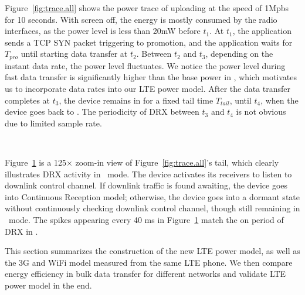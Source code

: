 Figure~\ref{fig:trace.all} shows the power trace of uploading at the speed of 1Mpbs for 10 seconds. With screen off, the energy is mostly consumed by the radio interfaces, as the power level is less than 20mW before $t_1$. At $t_1$, the application sends a TCP {\sf SYN} packet triggering \RI to \RC promotion, and the application waits for $T_{pro}$ until starting data transfer at $t_2$. Between $t_2$ and $t_3$, depending on the instant data rate, the power level fluctuates. We notice the power level during fast data transfer is significantly higher than the base power in \RC, which motivates us to incorporate data rates into our LTE power model. After the data transfer completes at $t_3$, the device remains in \RC for a fixed tail time $T_{tail}$, until $t_4$, when the device goes back to \RI. The periodicity of DRX between $t_3$ and $t_4$ is not obvious due to limited sample rate.


\begin{figure}[h]
\centering
{} \\
\label{fig:trace.zoom}
\end{figure}

Figure~\ref{fig:trace.zoom} is a 125$\times$ zoom-in view of Figure~\ref{fig:trace.all}'s tail, which clearly illustrates DRX activity in \RC~mode. The device activates its receivers to listen to downlink control channel. If downlink traffic is found awaiting, the device goes into Continuous Reception model; otherwise, the device goes into a dormant state without continuously checking downlink control channel, though still remaining in \RC~mode. The spikes appearing every 40 ms in Figure~\ref{fig:trace.zoom} match the on period of DRX in \RC.



\label{sec:power.model}
This section summarizes the construction of the new LTE power model, as well as the 3G and WiFi model measured from the same LTE phone. We then compare energy efficiency in bulk data transfer for different networks and validate LTE power model in the end.

